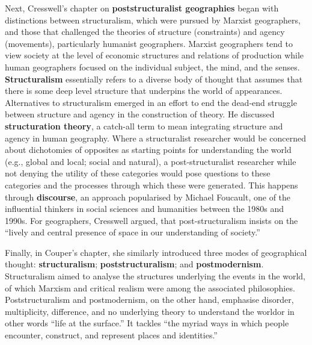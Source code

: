 \documentclass[a4paper, 10.5pt]{article} %
\begin{document}
Next, Cresswell's chapter on \textbf{poststructuralist geographies} began with distinctions between structuralism, which were pursued by Marxist geographers, and those that challenged the theories of structure (constraints) and agency (movements), particularly humanist geographers. Marxist geographers tend to view society at the level of economic structures and relations of production while human geographers focused on the individual subject, the mind, and the senses. \textbf{Structuralism} essentially refers to a diverse body of thought that assumes that there is some deep level structure that underpins the world of appearances. Alternatives to structuralism emerged in an effort to end the dead-end struggle between structure and agency in the construction of theory. He discussed \textbf{structuration theory}, a catch-all term to mean integrating structure and agency in human geography. Where a structuralist researcher would be concerned about dichotomies of opposites as starting points for understanding the world (e.g., global and local; social and natural), a post-structuralist researcher while not denying the utility of these categories would pose questions to these categories and the processes through which these were generated. This happens through \textbf{discourse}, an approach popularised by Michael Foucault, one of the influential thinkers in social sciences and humanities between the 1980s and 1990s. For geographers, Cresswell argued, that post-structuralism insists on the \enquote{lively and central presence of space in our understanding of society.}

Finally, in Couper's chapter, she similarly introduced three modes of geographical thought: \textbf{structuralism}; \textbf{poststructuralism}; and \textbf{postmodernism}. Structuralism aimed to analyse the structures underlying the events in the world, of which Marxism and critical realism were among the associated philosophies. Poststructuralism and postmodernism, on the other hand, emphasise disorder, multiplicity, difference, and no underlying theory to understand the world\textemdash{}or in other words \enquote{life at the surface.} It tackles \enquote{the myriad ways in which people encounter, construct, and represent places and identities.}





\end{document}
